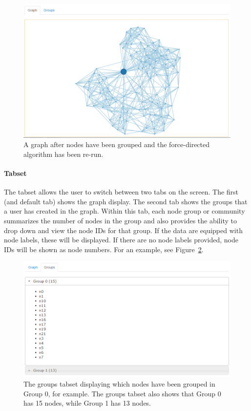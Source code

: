 \documentclass{article}\usepackage[]{graphicx}\usepackage[]{color}
\begin{document}
\begin{figure}[H]
\centering
\includegraphics[width=\textwidth]{images/graphgroup.png}
\caption{\label{fig:graphgroup} A graph after nodes have been grouped and the force-directed algorithm has been re-run.}
\end{figure}

\paragraph{Tabset} \label{par:group}
The tabset allows the user to switch between two tabs on the screen. The first (and default tab) shows the graph display. The second tab shows the groups that a user has created in the graph. Within this tab, each node group or community summarizes the number of nodes in the group and also provides the ability to drop down and view the node IDs for that group. If the data are equipped with node labels, these will be displayed. If there are no node labels provided, node IDs will be shown as node numbers. For an example, see Figure~\ref{fig:groupstab}.

\begin{figure}[H]
\centering
\includegraphics[width=\textwidth]{images/groupstab.png}
\caption{\label{fig:groupstab} The groups tabset displaying which nodes have been grouped in Group 0, for example. The groups tabset also shows that Group 0 has 15 nodes, while Group 1 has 13 nodes.}
\end{figure}
\end{document}
